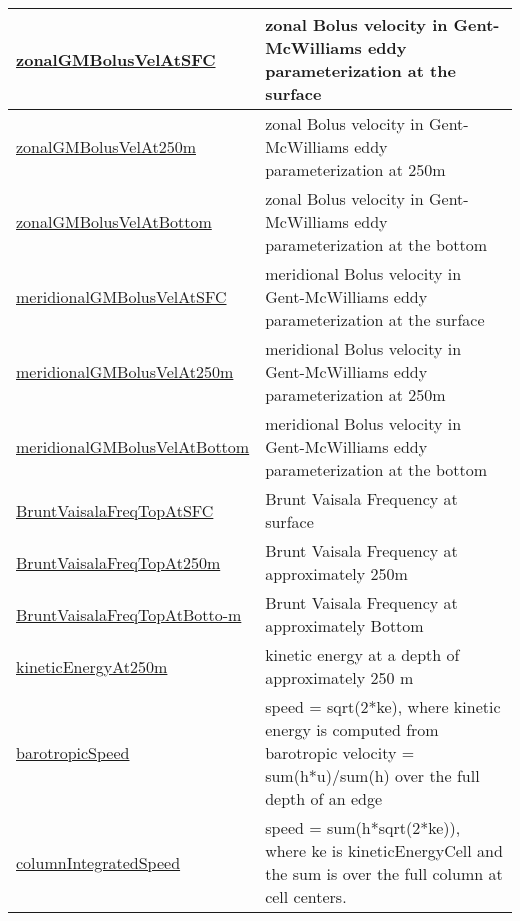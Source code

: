 {\begin{center}
\begin{longtable}{| p{2.0in} | p{4.0in} |}
    \hline
    \hyperref[subsec:var_sec_highFrequencyOutputAM_zonalGMBolusVelAtSFC]{zonalGMBolusVelAtSFC} & zonal Bolus velocity in Gent-McWilliams eddy parameterization at the surface \\
    \hline
    \hyperref[subsec:var_sec_highFrequencyOutputAM_zonalGMBolusVelAt250m]{zonalGMBolusVelAt250m} & zonal Bolus velocity in Gent-McWilliams eddy parameterization at 250m \\
    \hline
    \hyperref[subsec:var_sec_highFrequencyOutputAM_zonalGMBolusVelAtBottom]{zonalGMBolusVelAtBottom} & zonal Bolus velocity in Gent-McWilliams eddy parameterization at the bottom \\
    \hline
    \hyperref[subsec:var_sec_highFrequencyOutputAM_meridionalGMBolusVelAtSFC]{meridionalGMBolusVelAtSFC} & meridional Bolus velocity in Gent-McWilliams eddy parameterization at the surface \\
    \hline
    \hyperref[subsec:var_sec_highFrequencyOutputAM_meridionalGMBolusVelAt250m]{meridionalGMBolusVelAt250m} & meridional Bolus velocity in Gent-McWilliams eddy parameterization at 250m \\
    \hline
    \hyperref[subsec:var_sec_highFrequencyOutputAM_meridionalGMBolusVelAtBottom]{meridionalGMBolusVelAtBottom} & meridional Bolus velocity in Gent-McWilliams eddy parameterization at the bottom \\
    \hline
    \hyperref[subsec:var_sec_highFrequencyOutputAM_BruntVaisalaFreqTopAtSFC]{BruntVaisalaFreqTopAtSFC} & Brunt Vaisala Frequency at surface \\
    \hline
    \hyperref[subsec:var_sec_highFrequencyOutputAM_BruntVaisalaFreqTopAt250m]{BruntVaisalaFreqTopAt250m} & Brunt Vaisala Frequency at approximately 250m \\
    \hline
    \hyperref[subsec:var_sec_highFrequencyOutputAM_BruntVaisalaFreqTopAtBottom]{BruntVaisalaFreqTopAtBotto-}\hyperref[subsec:var_sec_highFrequencyOutputAM_BruntVaisalaFreqTopAtBottom]{m  }& Brunt Vaisala Frequency at approximately Bottom \\
    \hline
    \hyperref[subsec:var_sec_highFrequencyOutputAM_kineticEnergyAt250m]{kineticEnergyAt250m} & kinetic energy at a depth of approximately 250 m \\
    \hline
    \hyperref[subsec:var_sec_highFrequencyOutputAM_barotropicSpeed]{barotropicSpeed} & speed = sqrt(2*ke), where kinetic energy is computed from barotropic velocity = sum(h*u)/sum(h) over the full depth of an edge \\
    \hline
    \hyperref[subsec:var_sec_highFrequencyOutputAM_columnIntegratedSpeed]{columnIntegratedSpeed} & speed = sum(h*sqrt(2*ke)), where ke is kineticEnergyCell and the sum is over the full column at cell centers. \\

\end{longtable}
\end{center}}

